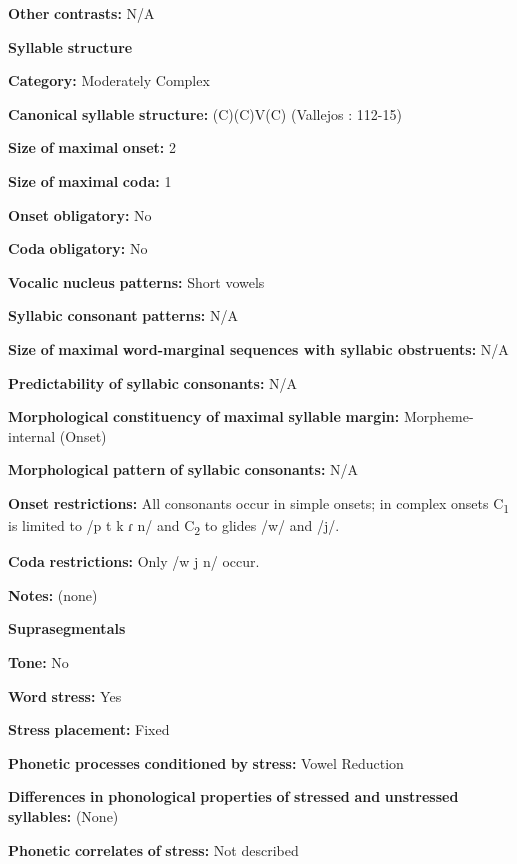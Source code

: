 \textbf{Other} \textbf{contrasts:} N/A

\textbf{Syllable} \textbf{structure}

\textbf{Category:} Moderately Complex

\textbf{Canonical} \textbf{syllable} \textbf{structure:} (C)(C)V(C) (Vallejos \citealt{Yopán2010}: 112-15)

\textbf{Size} \textbf{of} \textbf{maximal} \textbf{onset:} 2

\textbf{Size} \textbf{of} \textbf{maximal} \textbf{coda:} 1

\textbf{Onset} \textbf{obligatory:} No

\textbf{Coda} \textbf{obligatory:} No

\textbf{Vocalic} \textbf{nucleus} \textbf{patterns:} Short vowels

\textbf{Syllabic} \textbf{consonant} \textbf{patterns:} N/A

\textbf{Size} \textbf{of} \textbf{maximal} \textbf{word{}-marginal sequences with syllabic obstruents:} N/A

\textbf{Predictability} \textbf{of} \textbf{syllabic} \textbf{consonants:} N/A

\textbf{Morphological} \textbf{constituency} \textbf{of} \textbf{maximal} \textbf{syllable} \textbf{margin:} Morpheme-internal (Onset)

\textbf{Morphological} \textbf{pattern} \textbf{of} \textbf{syllabic} \textbf{consonants:} N/A

\textbf{Onset} \textbf{restrictions:} All consonants occur in simple onsets; in complex onsets C\textsubscript{1} is limited to /p t k ɾ n/ and C\textsubscript{2} to glides /w/ and /j/.

\textbf{Coda} \textbf{restrictions:} Only /w j n/ occur.

\textbf{Notes:} (none)

\textbf{Suprasegmentals}

\textbf{Tone:} No

\textbf{Word} \textbf{stress:} Yes

\textbf{Stress} \textbf{placement:} Fixed

\textbf{Phonetic} \textbf{processes} \textbf{conditioned} \textbf{by} \textbf{stress:} Vowel Reduction

\textbf{Differences} \textbf{in} \textbf{phonological} \textbf{properties} \textbf{of} \textbf{stressed} \textbf{and} \textbf{unstressed} \textbf{syllables:} (None)

\textbf{Phonetic} \textbf{correlates} \textbf{of} \textbf{stress:} Not described

